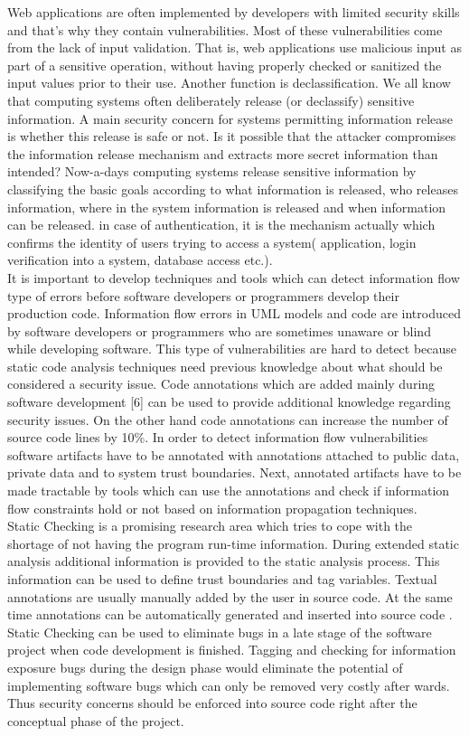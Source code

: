 Web applications are often implemented by developers with limited security skills and that's why they contain vulnerabilities. Most of these vulnerabilities come from the lack of input validation. That is, web applications use malicious input as part of a sensitive operation, without having properly checked or sanitized the input values
prior to their use. Another function is declassification. We all know that computing systems often deliberately release (or declassify) sensitive information. A main security concern for systems permitting information release is whether this release is safe or not. Is it possible that the attacker compromises the information release mechanism and extracts more secret information than intended? Now-a-days computing systems release sensitive information by classifying the basic goals according to what information is released, who releases information, where in the system information is released and when information can be released. in case of authentication, it is the mechanism actually which confirms the identity of users trying to access a system( application, login verification into a system, database access etc.). \\

It is important to develop techniques and tools which can detect information flow type of errors before software developers or programmers develop their production code. Information flow errors in UML models and code are introduced by software developers or programmers who are sometimes unaware or blind while developing software. This type of vulnerabilities are hard to detect because static code analysis techniques need previous knowledge about what should be considered a security issue. Code annotations which are added mainly during software development [6] can be used to provide additional knowledge regarding security issues. On the other hand code annotations can increase the number of source code lines by 10\%. In order to detect information flow vulnerabilities software artifacts have to be annotated with annotations attached to public data, private data and to system trust boundaries. Next, annotated artifacts have to be made tractable by tools which can use the annotations and check if information flow constraints hold or not based on information propagation techniques.\\

Static Checking is a promising research area which tries to cope with the shortage of not having the program run-time information. During extended static analysis additional information is provided to the static analysis process. This information can be used to define trust boundaries and tag variables. Textual annotations are usually manually added by the user in source code. At the same time annotations can be automatically generated and inserted into source code . Static Checking can be used to eliminate bugs in a late stage of the software project when code development is finished. Tagging and checking for information exposure bugs during the design phase would eliminate the potential of implementing software bugs which can only be removed very costly after wards. Thus security concerns should be enforced into source code right after the conceptual phase of the project. \\

